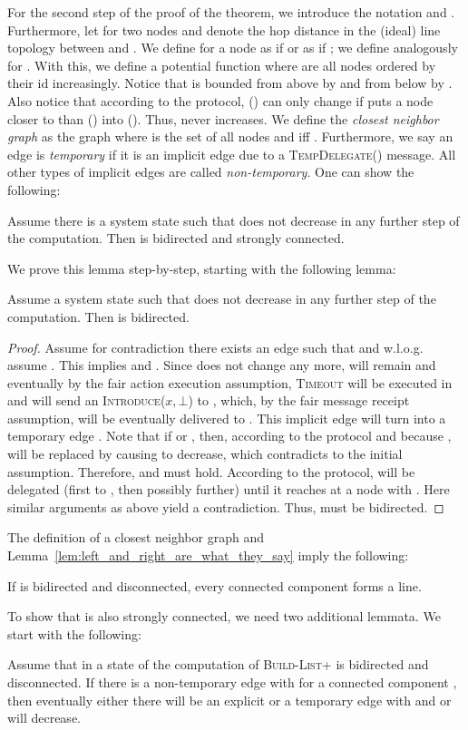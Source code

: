 \documentclass[a4paper,USenglish]{lipics}
\newcommand{\blp}{\textsc{Build-List+}\xspace}
\newcommand{\introduce}[1]{\textsc{Introduce(\ensuremath{#1})}\xspace}
\newcommand{\tempdelegate}[1]{\textsc{TempDelegate(\ensuremath{#1})}\xspace}
\newcommand{\timeout}{\textsc{Timeout}\xspace}
\begin{document}
For the second step of the proof of the theorem, we introduce the notation  and .
Furthermore, let  for two nodes  and  denote the hop distance in the (ideal) line topology between  and .
We define  for a node  as  if  or as  if ; we define  analogously for .
With this, we define a potential function  where  are all nodes ordered by their id increasingly.
Notice that  is bounded from above by  and from below by .
Also notice that according to the protocol,  () can only change if  puts a node closer to  than  () into  ().
Thus,  never increases.
We define the \emph{closest neighbor graph} as the graph  where  is the set of all nodes and  iff .
Furthermore, we say an edge is \emph{temporary} if it is an implicit edge due to a \tempdelegate{} message.
 All other types of implicit edges are called \emph{non-temporary}.
One can show the following:
\begin{lemma}\label{lem:closest_neighbor_graph_bidirected_and_strongly_connected}
 Assume there is a system state such that  does not decrease in any further step of the computation.
 Then  is bidirected and strongly connected.
\end{lemma}
We prove this lemma step-by-step, starting with the following lemma:
\begin{lemma}\label{lem:closest_neighbor_graph_bidirected}
 Assume a system state such that  does not decrease in any further step of the computation.
 Then  is bidirected.
\end{lemma}

\begin{proof}
 Assume for contradiction there exists an edge  such that  and w.l.o.g. assume .
 This implies  and .
 Since  does not change any more,  will remain  and eventually by the fair action execution assumption, \timeout will be executed in  and  will send an \introduce{x,\bot} to , which, by the fair message receipt assumption, will be eventually delivered to .
 This implicit edge will turn into a temporary edge .
 Note that if  or , then, according to the protocol and because ,  will be replaced by  causing  to decrease, which contradicts to the initial assumption.
 Therefore,  and  must hold.
 According to the protocol,  will be delegated (first to , then possibly further) until it reaches at a node  with  .
 Here similar arguments as above yield a contradiction. 
 Thus,  must be bidirected.
\end{proof}
The definition of a closest neighbor graph and Lemma~\ref{lem:left_and_right_are_what_they_say} imply the following:
\begin{corollary}\label{cor:only_topology_is_line}
 If  is bidirected and disconnected, every connected component forms a line.
\end{corollary}
To show that  is also strongly connected, we need two additional lemmata.
We start with the following:
 \begin{lemma}\label{lem:non_temporary_will_become_expl_or_temporary}
  Assume that in a state of the computation of \blp  is bidirected and disconnected.
  If there is a non-temporary edge  with  for a connected component , then eventually either there will be an explicit or a temporary edge  with  and  or  will decrease.
 \end{lemma}
 
\end{document}
